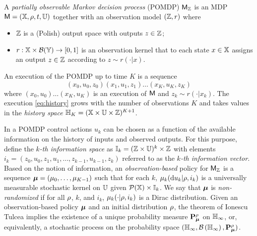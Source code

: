 \documentclass{ifacconf}
\begin{document}
\begin{definition}
\label{def:POMDP}

A \emph{partially observable Markov decision process} (POMDP) $\mathsf{M}_{{\mathbb{Z}}}$ is an MDP $\mathsf{M} = ({\mathbb{X}}, \rho, t, {\mathbb{U}})$ together with an observation model $({\mathbb{Z}}, r)$ where
\begin{itemize}
	\item ${\mathbb{Z}}$ is a (Polish) output space with outputs $z \in {\mathbb{Z}}$;
  \item $r : {\mathbb{X}} \times \mathcal B({\mathbb{Y}}) \rightarrow [0,1]$ is an observation kernel that to each state $x \in {\mathbb{X}}$ assigns an output $z \in {\mathbb{Z}}$ according to $z\sim r(\cdot|x)$.
\end{itemize}
\end{definition}

An execution of the POMDP up to time $K$ is a sequence
\begin{equation}
\label{eq:history}
  (x_0,u_0,z_0) (x_1,u_1,z_1) \ldots (x_K,u_K,z_K)
\end{equation}
where $(x_0, u_0) \ldots (x_K, u_K)$ is an execution of $\mathsf{M}$ and $z_k \sim r(\cdot | x_k)$. The execution \eqref{eq:history} grows with the number of observations $K$ and takes values in the \emph{history space} ${\mathbb{H}}_K = ({\mathbb{X}} \times {\mathbb{U}} \times {\mathbb{Z}})^{K+1}$.

In a POMDP control actions $u_k$ can be chosen as a function of the available information on the history of inputs and observed outputs. For this purpose, define the \emph{$k$-th information space} as ${\mathbb{I}}_k = ({\mathbb{Z}} \times {\mathbb{U}})^{k} \times {\mathbb{Z}}$ with elements $i_k = (z_0,u_0,z_1,u_1,\ldots,z_{k-1}, u_{k-1}, z_k)$ referred to as the \emph{$k$-th information vector}. Based on the notion of information, an \emph{observation-based} policy for $\mathsf{M}_{{\mathbb{Z}}}$ is a sequence ${\boldsymbol{\mu}}=({\mu}_0,\ldots,{\mu}_{K-1})$ such that for each $k$, ${\mu}_k( \mathrm{d} u_k|\rho, i_k)$ is a universally measurable stochastic kernel on ${\mathbb{U}}$  given $\mathcal{P}({\mathbb{X}})\times {\mathbb{I}}_k$. We say that ${\boldsymbol{\mu}}$ is \emph{non-randomized} if for all $\rho$, $k$, and $i_k$, ${\mu}_k(\cdot|\rho, i_k)$ is a Dirac distribution. %
%
Given an observation-based policy ${\boldsymbol{\mu}}$ and an initial distribution $\rho$, the theorem of Ionescu Tulcea \citep{hll1996} implies the existence of a unique probability measure $\mathbf{P}_{\boldsymbol{\mu}}^\rho$ on ${\mathbb{H}}_\infty$, or, equivalently, a stochastic process on the probability space $({\mathbb{H}}_\infty, \mathcal{B}\left({\mathbb{H}}_\infty\right), \mathbf{P}_{\boldsymbol{\mu}}^\rho)$. 
\end{document}
